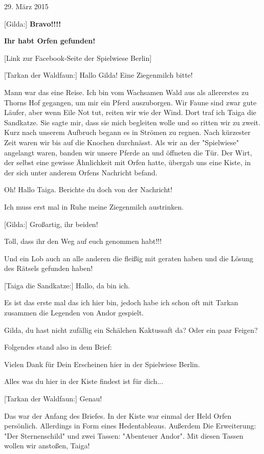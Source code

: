 \documentclass[10pt, a4paper, oneside]{book}
\begin{document}
\begin{multicols}{2}
\begin{center}
    29. März 2015
\end{center}

[Gilda:] \textbf{Bravo!!!!}

\textbf{Ihr habt Orfen gefunden!}

[Link zur Facebook-Seite der Spielwiese Berlin]

[Tarkan der Waldfaun:] Hallo Gilda! Eine Ziegenmilch bitte!

Mann war das eine Reise. Ich bin vom Wachsamen Wald aus als allererstes zu Thorns Hof gegangen, um mir ein Pferd auszuborgen. Wir Faune sind zwar gute Läufer, aber wenn Eile Not tut, reiten wir wie der Wind. Dort traf ich Taiga die Sandkatze. Sie sagte mir, dass sie mich begleiten wolle und so ritten wir zu zweit. Kurz nach unserem Aufbruch begann es in Strömen zu regnen. Nach kürzester Zeit waren wir bis auf die Knochen durchnässt. Als wir an der "Spielwiese" angelangt waren, banden wir unsere Pferde an und öffneten die Tür. Der Wirt, der selbst eine gewisse Ähnlichkeit mit Orfen hatte, übergab uns eine Kiste, in der sich unter anderem Orfens Nachricht befand.

Oh! Hallo Taiga. Berichte du doch von der Nachricht!

Ich muss erst mal in Ruhe meine Ziegenmilch austrinken.

[Gilda:] Großartig, ihr beiden!

Toll, dass ihr den Weg auf euch genommen habt!!!

Und ein Lob auch an alle anderen die fleißig mit geraten haben und die Lösung des Rätsels gefunden haben!

[Taiga die Sandkatze:] Hallo, da bin ich.

Es ist das erste mal das ich hier bin, jedoch habe ich schon oft mit Tarkan zusammen die Legenden von Andor gespielt.

Gilda, du hast nicht zufällig ein Schälchen Kaktussaft da? Oder ein paar Feigen?

Folgendes stand also in dem Brief:

Vielen Dank für Dein Erscheinen hier in der Spielwiese Berlin.

Alles was du hier in der Kiste findest ist für dich... 

[Tarkan der Waldfaun:] Genau!

Das war der Anfang des Briefes. In der Kiste war einmal der Held Orfen persönlich. Allerdings in Form eines Hedentableaus. Außerdem Die Erweiterung: "Der Sternenschild" und zwei Tassen: "Abenteuer Andor". Mit diesen Tassen wollen wir anstoßen, Taiga!


\end{multicols}
\end{document}
